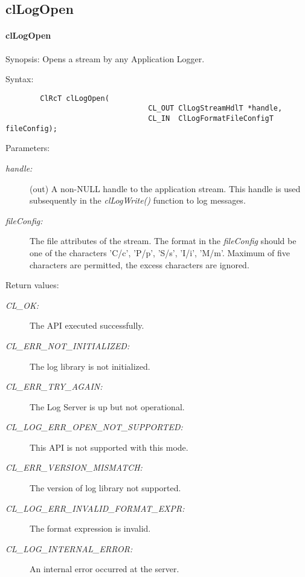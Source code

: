 \subsection{clLogOpen}
\hypertarget{pagelog105}{}\paragraph{cl\-Log\-Open}\label{pagelog105}
\begin{Desc}
\item[Synopsis:]Opens a stream by any Application Logger.\end{Desc}
\begin{Desc}
\item[Syntax:]

\footnotesize\begin{verbatim}        ClRcT clLogOpen(
                                 CL_OUT ClLogStreamHdlT *handle,
                                 CL_IN  ClLogFormatFileConfigT    fileConfig);
\end{verbatim}
\normalsize
\end{Desc}
\begin{Desc}
\item[Parameters:]
\begin{description}
\item[{\em handle:}](out) A non-NULL handle to the application stream. This handle is used subsequently in the \textit{clLogWrite()} function to log 
messages.\item[{\em file\-Config:}]The file attributes of the stream. The format in the {\em file\-Config\/} should be one of the characters 'C/c',
'P/p', 'S/s', 'I/i', 'M/m'. Maximum of five characters are permitted, the excess characters are ignored.\end{description}
\end{Desc}
\begin{Desc}
\item[Return values:]
\begin{description}
\item[{\em CL\_\-OK:}]The API executed successfully. \item[{\em CL\_\-ERR\_\-NOT\_\-INITIALIZED:}]The log library is not initialized. \item[{\em CL\_\-ERR\_\-TRY\_\-AGAIN:}]The Log Server is up but not operational. \item[{\em CL\_\-LOG\_\-ERR\_\-OPEN\_\-NOT\_\-SUPPORTED:}]This API is not supported with this mode. \item[{\em CL\_\-ERR\_\-VERSION\_\-MISMATCH:}]The version of log library not supported. \item[{\em CL\_\-LOG\_\-ERR\_\-INVALID\_\-FORMAT\_\-EXPR:}]The format expression is invalid. \item[{\em CL\_\-LOG\_\-INTERNAL\_\-ERROR:}]An internal error occurred at the server.\end{description}
\end{Desc}
